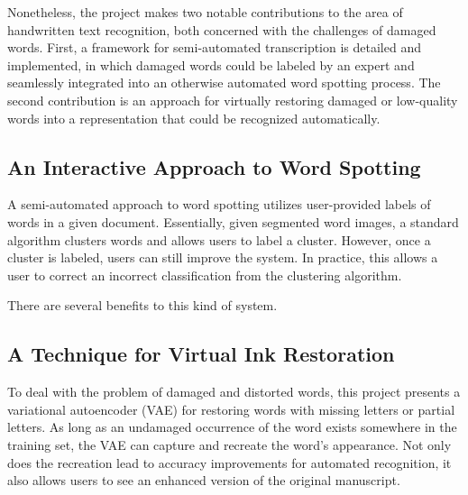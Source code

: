 \documentclass[final]{ukthesis}
\begin{document}
Nonetheless, the project makes two notable contributions to the area of handwritten text recognition, both concerned with the challenges of damaged words. First, a framework for semi-automated transcription is detailed and implemented, in which damaged words could be labeled by an expert and seamlessly integrated into an otherwise automated word spotting process. The second contribution is an approach for virtually restoring damaged or low-quality words into a representation that could be recognized automatically.


\subsection{An Interactive Approach to Word Spotting}
A semi-automated approach to word spotting utilizes user-provided labels of words in a given document. Essentially, given segmented word images, a standard algorithm clusters words and allows users to label a cluster. However, once a cluster is labeled, users can still improve the system. In practice, this allows a user to correct an incorrect classification from the clustering algorithm.

There are several benefits to this kind of system.


\subsection{A Technique for Virtual Ink Restoration}
To deal with the problem of damaged and distorted words, this project presents a variational autoencoder (VAE) for restoring words with missing letters or partial letters. As long as an undamaged occurrence of the word exists somewhere in the training set, the VAE can capture and recreate the word's appearance. Not only does the recreation lead to accuracy improvements for automated recognition, it also allows users to see an enhanced version of the original manuscript.
\end{document}
